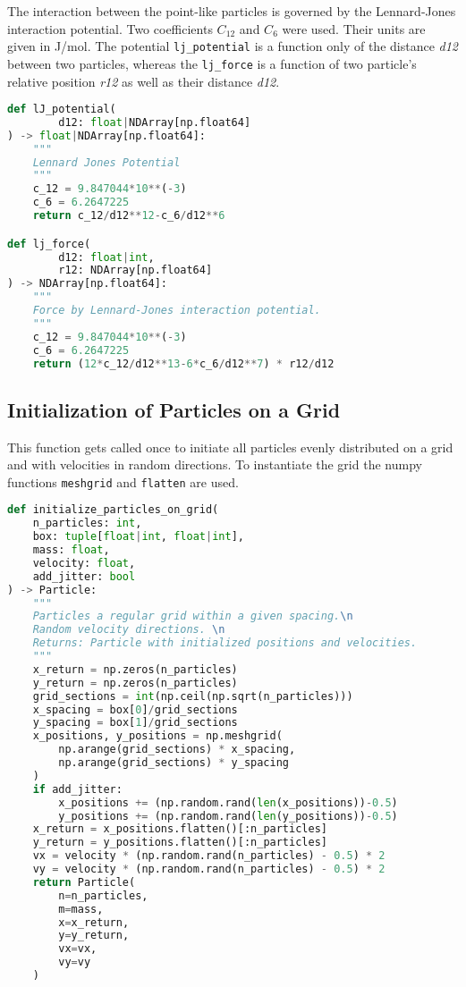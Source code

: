 \documentclass{article}
\begin{document}
The interaction between the point-like particles is governed by the Lennard-Jones interaction potential. Two coefficients $C_{12}$ and $C_6$ were used. Their units are given in J/mol. The potential \texttt{lj\_potential} is a function only of the distance \textit{d12} between two particles, whereas the \texttt{lj\_force} is a function of two particle's relative position \textit{r12} as well as their distance \textit{d12}.

\begin{lstlisting}[language=Python, caption={Interaction potential and force}]
def lJ_potential(
        d12: float|NDArray[np.float64]
) -> float|NDArray[np.float64]:
    """
    Lennard Jones Potential
    """
    c_12 = 9.847044*10**(-3)  
    c_6 = 6.2647225           
    return c_12/d12**12-c_6/d12**6

def lj_force(
        d12: float|int,
        r12: NDArray[np.float64]
) -> NDArray[np.float64]:
    """
    Force by Lennard-Jones interaction potential.
    """
    c_12 = 9.847044*10**(-3)  
    c_6 = 6.2647225           
    return (12*c_12/d12**13-6*c_6/d12**7) * r12/d12
\end{lstlisting}

\subsection{Initialization of Particles on a Grid}\label{GridInit}
This function gets called once to initiate all particles evenly distributed on a grid and with velocities in random directions. To instantiate the grid the numpy functions \texttt{meshgrid} and \texttt{flatten} are used. 
\begin{lstlisting}[language=Python, caption=Particle Initialization on a Grid]
def initialize_particles_on_grid(
    n_particles: int, 
    box: tuple[float|int, float|int], 
    mass: float, 
    velocity: float,
    add_jitter: bool
) -> Particle:
    """
    Particles a regular grid within a given spacing.\n
    Random velocity directions. \n
    Returns: Particle with initialized positions and velocities. 
    """
    x_return = np.zeros(n_particles)
    y_return = np.zeros(n_particles)
    grid_sections = int(np.ceil(np.sqrt(n_particles))) 
    x_spacing = box[0]/grid_sections 
    y_spacing = box[1]/grid_sections
    x_positions, y_positions = np.meshgrid(
        np.arange(grid_sections) * x_spacing, 
        np.arange(grid_sections) * y_spacing
    )
    if add_jitter:
        x_positions += (np.random.rand(len(x_positions))-0.5)
        y_positions += (np.random.rand(len(y_positions))-0.5)
    x_return = x_positions.flatten()[:n_particles]
    y_return = y_positions.flatten()[:n_particles]
    vx = velocity * (np.random.rand(n_particles) - 0.5) * 2
    vy = velocity * (np.random.rand(n_particles) - 0.5) * 2
    return Particle(
        n=n_particles,
        m=mass,
        x=x_return,
        y=y_return,
        vx=vx,
        vy=vy
    )
\end{lstlisting}
\end{document}
